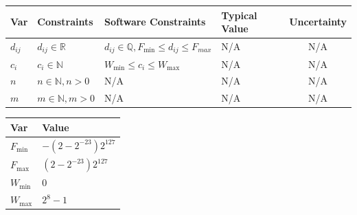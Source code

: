 \documentclass[12pt]{article}
\begin{document}

\begin{table}[H]
  \caption{Input Variables} \label{TblInputVar}
  \renewcommand{\arraystretch}{1.2}
\noindent \begin{longtable*}{l l l l c} 
  \toprule
  \textbf{Var} & \textbf{Constraints} & \textbf{Software Constraints} &
                             \textbf{Typical Value} & \textbf{Uncertainty}\\
  \midrule 
  $d_{ij}$ & $d_{ij} \in  \mathbb{R}$ &  $d_{ij} \in  \mathbb{Q}, F_{\min} \leq d_{ij} \leq F_{max}$  & N/A & N/A \\
    $c_{i}$ & $c_{i} \in  \mathbb{N}$ &  $W_{\min} \leq c_{i} \leq W_{\max}$ & N/A & N/A \\
    $n$ & $n \in  \mathbb{N}, n > 0$ &  N/A & N/A & N/A \\
    $m$ & $m \in  \mathbb{N}, m > 0$ &  N/A & N/A & N/A \\
  \bottomrule
\end{longtable*}
\end{table}

\noindent 

\begin{table}[H]
\caption{Specification Parameter Values} \label{TblSpecParams}
\renewcommand{\arraystretch}{1.2}
\noindent \begin{longtable*}{l l} 
  \toprule
  \textbf{Var} & \textbf{Value} \\
  \midrule 
  $F_{\min}$ & $-(2 -2^{-23})2^{127}$\\
  $F_{\max}$ & $(2-2^{-23})2^{127}$\\
    $W_{\min}$ & 0\\
  $W_{\max}$ &  $2^{8} - 1$\\
  \bottomrule
\end{longtable*}
\end{table}
\end{document}
